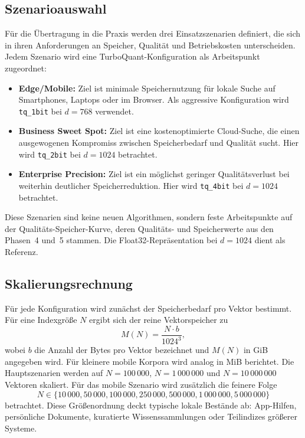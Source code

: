 \subsection{Szenarioauswahl}
%
Für die Übertragung in die Praxis werden drei Einsatzszenarien definiert, die sich in ihren Anforderungen an Speicher, Qualität und Betriebskosten unterscheiden.
Jedem Szenario wird eine TurboQuant-Konfiguration als Arbeitspunkt zugeordnet:
\begin{itemize}
  \item \textbf{Edge/Mobile:} Ziel ist minimale Speichernutzung für lokale Suche auf Smartphones, Laptops oder im Browser. Als aggressive Konfiguration wird \texttt{tq\_1bit} bei $d = 768$ verwendet.
  \item \textbf{Business Sweet Spot:} Ziel ist eine kostenoptimierte Cloud-Suche, die einen ausgewogenen Kompromiss zwischen Speicherbedarf und Qualität sucht. Hier wird \texttt{tq\_2bit} bei $d = 1024$ betrachtet.
  \item \textbf{Enterprise Precision:} Ziel ist ein möglichst geringer Qualitätsverlust bei weiterhin deutlicher Speicherreduktion. Hier wird \texttt{tq\_4bit} bei $d = 1024$ betrachtet.
\end{itemize}
%
Diese Szenarien sind keine neuen Algorithmen, sondern feste Arbeitspunkte auf der Qualitäts-Speicher-Kurve, deren Qualitäts- und Speicherwerte aus den Phasen~4 und~5 stammen.
Die Float32-Repräsentation bei $d = 1024$ dient als Referenz.
%
\subsection{Skalierungsrechnung}
%
Für jede Konfiguration wird zunächst der Speicherbedarf pro Vektor bestimmt.
Für eine Indexgröße $N$ ergibt sich der reine Vektorspeicher zu
\begin{equation}
  M(N) = \frac{N \cdot b}{1024^3},
\end{equation}
%
wobei $b$ die Anzahl der Bytes pro Vektor bezeichnet und $M(N)$ in GiB angegeben wird.
Für kleinere mobile Korpora wird analog in MiB berichtet.
%
Die Hauptszenarien werden auf $N = 100\,000$, $N = 1\,000\,000$ und $N = 10\,000\,000$ Vektoren skaliert.
Für das mobile Szenario wird zusätzlich die feinere Folge
\[
  N \in \{10\,000, 50\,000, 100\,000, 250\,000, 500\,000, 1\,000\,000, 5\,000\,000\}
\]
%
betrachtet.
Diese Größenordnung deckt typische lokale Bestände ab: App-Hilfen, persönliche Dokumente, kuratierte Wissenssammlungen oder Teilindizes größerer Systeme.
%
